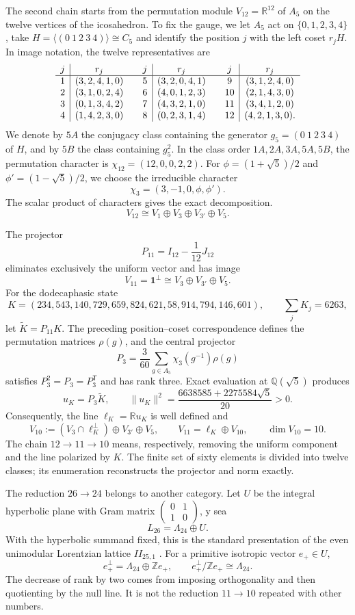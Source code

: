 The second chain starts from the permutation module
\(V_{12}=\mathbb R^{12}\) of \(A_5\) on the twelve vertices of the icosahedron.
To fix the gauge, we let \(A_5\) act on
\(\{0,1,2,3,4\}\), take
\(H=\langle(0\ 1\ 2\ 3\ 4)\rangle\cong C_5\) and identify the position
\(j\) with the left coset \(r_jH\). In image notation, the twelve
representatives are
\[
\begin{array}{c|c@{\qquad}c|c@{\qquad}c|c}
j&r_j&j&r_j&j&r_j\\ \hline
1&(3,2,4,1,0)&5&(3,2,0,4,1)&9&(3,1,2,4,0)\\
2&(3,1,0,2,4)&6&(4,0,1,2,3)&10&(2,1,4,3,0)\\
3&(0,1,3,4,2)&7&(4,3,2,1,0)&11&(3,4,1,2,0)\\
4&(1,4,2,3,0)&8&(0,2,3,1,4)&12&(4,2,1,3,0).
\end{array}
\]
We denote by \(5A\) the conjugacy class containing the generator
\(g_5=(0\ 1\ 2\ 3\ 4)\) of \(H\), and by \(5B\) the class containing
\(g_5^2\). In the class order \(1A,2A,3A,5A,5B\), the permutation character is
\(\chi_{12}=(12,0,0,2,2)\). For
\(\phi=(1+\sqrt5)/2\) and \(\phi'=(1-\sqrt5)/2\), we choose the irreducible
character
\[
 \chi_3=(3,-1,0,\phi,\phi').
\]
The scalar product of characters gives the exact decomposition.
\[
 V_{12}\cong V_1\oplus V_3\oplus V_{3'}\oplus V_5.
\]

The projector
\[
 P_{11}=I_{12}-\frac1{12}J_{12}
\]
eliminates exclusively the uniform vector and has image
\[
 V_{11}=\mathbf1^\perp\cong V_3\oplus V_{3'}\oplus V_5.
\]
For the dodecaphasic state
\[
 K=(234,543,140,729,659,824,621,58,914,794,146,601),
 \qquad \sum_jK_j=6263,
\]
let \(\widetilde K=P_{11}K\). The preceding position--coset correspondence
defines the permutation matrices \(\rho(g)\), and the central projector
\[
 P_3=\frac3{60}\sum_{g\in A_5}\chi_3(g^{-1})\rho(g)
\]
satisfies \(P_3^2=P_3=P_3^{\mathsf T}\) and has rank three. Exact evaluation
at \(\mathbb Q(\sqrt5)\) produces
\[
 u_K=P_3\widetilde K,
 \qquad
 \|u_K\|^2=\frac{6638585+2275584\sqrt5}{20}>0.
\]
Consequently, the line \(\ell_K=\mathbb Ru_K\) is well defined and
\[
 V_{10}:=(V_3\cap\ell_K^\perp)\oplus V_{3'}\oplus V_5,
 \qquad
 V_{11}=\ell_K\oplus V_{10},
 \qquad \dim V_{10}=10.
\]
The chain \(12\to11\to10\) means, respectively, removing the
uniform component and the line polarized by \(K\). The finite set of
sixty elements is divided into twelve classes; its enumeration
reconstructs the projector and norm exactly.

The reduction \(26\to24\) belongs to another category. Let \(U\) be the integral
hyperbolic plane with Gram matrix
\(\left(\begin{smallmatrix}0&1\\1&0\end{smallmatrix}\right)\), y sea
\[
 L_{26}=\Lambda_{24}\oplus U.
\]
With the hyperbolic summand fixed, this is the standard presentation of the
even unimodular Lorentzian lattice \(II_{25,1}\)
\cite{ConwaySloane1999}.
For a primitive isotropic vector \(e_+\in U\),
\[
 e_+^\perp=\Lambda_{24}\oplus\mathbb Ze_+,
\qquad
 e_+^\perp/\mathbb Ze_+\cong\Lambda_{24}.
\]
The decrease of rank by two comes from imposing orthogonality and then quotienting
by the null line. It is not the reduction \(11\to10\) repeated with other
numbers.

